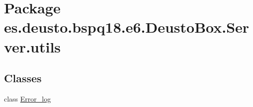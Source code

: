 \hypertarget{namespacees_1_1deusto_1_1bspq18_1_1e6_1_1_deusto_box_1_1_server_1_1utils}{}\section{Package es.\+deusto.\+bspq18.\+e6.\+Deusto\+Box.\+Server.\+utils}
\label{namespacees_1_1deusto_1_1bspq18_1_1e6_1_1_deusto_box_1_1_server_1_1utils}
\subsection*{Classes}
\begin{DoxyCompactItemize}
\item 
class \mbox{\hyperlink{classes_1_1deusto_1_1bspq18_1_1e6_1_1_deusto_box_1_1_server_1_1utils_1_1_error__log}{Error\+\_\+log}}
\end{DoxyCompactItemize}

